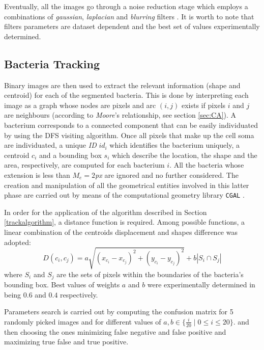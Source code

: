 \documentclass[conference]{IEEEtran}
\begin{document}
Eventually, all the images go through a noise reduction stage which employs a combinations of \textit{gaussian}, \textit{laplacian} and \textit{blurring} filters \cite{Deng:1993}.
It is worth to note that filters parameters are dataset dependent and the best set of values experimentally determined. 





\subsection{Bacteria Tracking}

Binary images are then used to extract the relevant information (shape and centroid) for each of the segmented bacteria.
This is done by interpreting each image as a graph whose nodes are pixels and arc $(i,j)$ exists if pixels $i$ and $j$ are neighbours (according to \textit{Moore}'s relationship, see section \ref{sec:CA}).
A bacterium corresponds to a connected component that can be easily individuated by using the DFS visiting algorithm.
Once all pixels that make up the cell soma are individuated, a unique \textit{ID} $id_i$ which identifies the bacterium uniquely, a centroid $c_i$ and a bounding box $s_i$ which describe the location, the shape and the area, respectively, are computed for each bacterium $i$. All the bacteria whose extension is less than $M_e = 2$\textit{px} are ignored and no further considered.
The creation and manipulation of all the geometrical entities involved in this latter phase are carried out by means of the computational geometry library \texttt{CGAL}  \cite{CGAL}.

In order for the application of the algorithm described in Section \ref{trackalgorithm}, a distance function is required.
Among possible functions, a linear combination of the centroids displacement and shapes difference was adopted:
\begin{equation}
\label{sec:bacttracking}
D(c_i,c_j) = a \sqrt{(x_{c_i} - x_{c_j})^2 + (y_{c_i}-y_{c_j})^2} + b |S_i \cap S_j|
\end{equation}
where $S_i$ and $S_j$ are the sets of pixels within the boundaries of the bacteria's  bounding box. Best values of weights $a$ and $b$ were experimentally determined in being $0.6$ and $0.4$ respectively. 

Parameters search is carried out by computing the confusion matrix for 5 randomly picked images and for different values of $a,b \in \{\frac{i}{20}\;|\;0\leq i \leq 20\}$. and then choosing the ones minimizing false negative and false positive and maximizing true false and true positive. 
\end{document}
